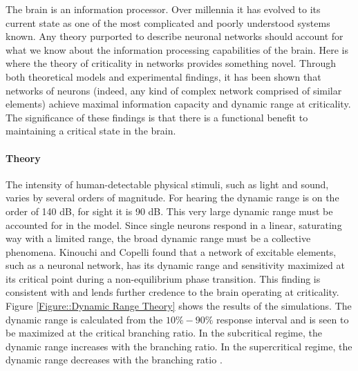 \documentclass[12pt]{article}
\begin{document}
The brain is an information processor. Over millennia it has evolved to its current state as one of the most complicated and poorly understood systems known. Any theory purported to describe neuronal networks should account for what we know about the information processing capabilities of the brain. Here is where the theory of criticality in networks provides something novel. Through both theoretical models and experimental findings, it has been shown that networks of neurons (indeed, any kind of complex network comprised of similar elements) achieve maximal information capacity and dynamic range at criticality. The significance of these findings is that there is a functional benefit to maintaining a critical state in the brain.
   
\paragraph{Theory}
The intensity of human-detectable physical stimuli, such as light and sound, varies by several orders of magnitude. For hearing the dynamic range is on the order of 140 dB, for sight it is 90 dB. This very large dynamic range must be accounted for in the model. Since single neurons respond in a linear, saturating way with a limited range, the broad dynamic range must be a collective phenomena. Kinouchi and Copelli found that a network of excitable elements, such as a neuronal network, has its dynamic range and sensitivity maximized at its critical point during a non-equilibrium phase transition\cite{Kinouchi2006b}. This finding is consistent with and lends further credence to the brain operating at criticality. Figure \ref{Figure::Dynamic Range Theory} shows the results of the simulations. The dynamic range is calculated from the $10\%-90\%$ response interval and is seen to be maximized at the critical branching ratio. In the subcritical regime, the dynamic range increases with the branching ratio. In the supercritical regime, the dynamic range decreases with the branching ratio \cite{Larremore2011a, Larremore2012a}.
\end{document}
